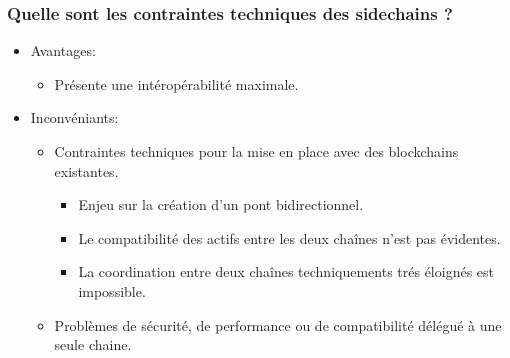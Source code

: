 \begin{frame} 
  \frametitle{Quelle sont les contraintes techniques des sidechains ?} 
  \begin{itemize} 
    \item Avantages:
    \begin{itemize}
      \item Présente une intéropérabilité maximale.
    \end{itemize}
    \item Inconvéniants:
    \begin{itemize}
      \item Contraintes techniques pour la mise en place avec des blockchains existantes.
      \begin{itemize}
        \item Enjeu sur la création d’un pont bidirectionnel.
        \item Le compatibilité des actifs entre les deux chaînes n'est pas évidentes. 
        \item La coordination entre deux chaînes techniquements trés éloignés est impossible.
      \end{itemize}
      \item Problèmes de sécurité, de performance ou de compatibilité délégué à une seule chaine.
    \end{itemize}
  \end{itemize} 
\end{frame}